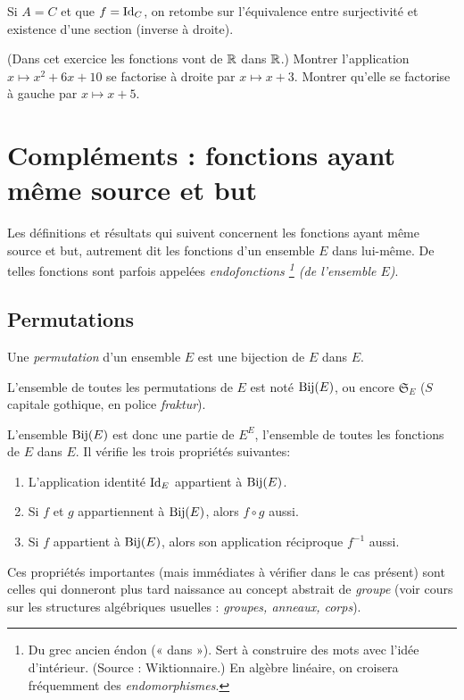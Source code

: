 \begin{remarque}
Si $A = C$ et que $f = \operatorname{Id}_C$, on retombe sur l'équivalence entre surjectivité et existence d'une section (inverse à droite).
\end{remarque}

\begin{exercice} 
(Dans cet exercice les fonctions vont de $\mathbb{R}$ dans $\mathbb{R}$.) 
Montrer l'application $x\mapsto x^2+6x+10$ se factorise à droite par $x\mapsto x+3$.
 Montrer qu'elle se factorise à gauche par $x\mapsto x+5$.
\end{exercice}






\section{Compléments : fonctions ayant même source et but}



Les définitions et résultats qui suivent concernent les fonctions ayant même source et but, autrement dit les fonctions d'un ensemble $E$ dans lui-même. De telles fonctions sont parfois appelées \emph{endofonctions
\footnote{Du grec ancien éndon (« dans »). Sert à construire des mots avec l’idée d’intérieur. (Source : Wiktionnaire.) En algèbre linéaire, on croisera fréquemment des \emph{endomorphismes}.}
 (de l'ensemble $E$)}.


\subsection{Permutations}

\begin{definition}
Une \emph{permutation} d'un ensemble $E$ est une bijection de $E$ dans $E$. 
\end{definition}

L'ensemble de toutes les permutations de $E$ est noté $\operatorname{Bij}(E)$, ou encore $\mathfrak S_E$ ($S$ capitale gothique, en police \emph{fraktur}).

L'ensemble $\operatorname{Bij}(E)$ est donc une partie de $E^E$, l'ensemble de toutes les fonctions de $E$ dans $E$. Il vérifie les trois propriétés suivantes:
\begin{enumerate}
\item L'application identité $\operatorname{Id}_E$ appartient à $\operatorname{Bij}(E)$.
\item Si $f$ et $g$ appartiennent à $\operatorname{Bij}(E)$, alors $f\circ g$ aussi.
\item Si $f$ appartient à $\operatorname{Bij}(E)$, alors son application réciproque $f^{-1}$ aussi.
\end{enumerate}
Ces propriétés importantes (mais immédiates à vérifier dans le cas présent) sont celles qui donneront plus tard naissance au concept abstrait de \emph{groupe} (voir cours sur les structures algébriques usuelles : \emph{groupes, anneaux, corps}).


